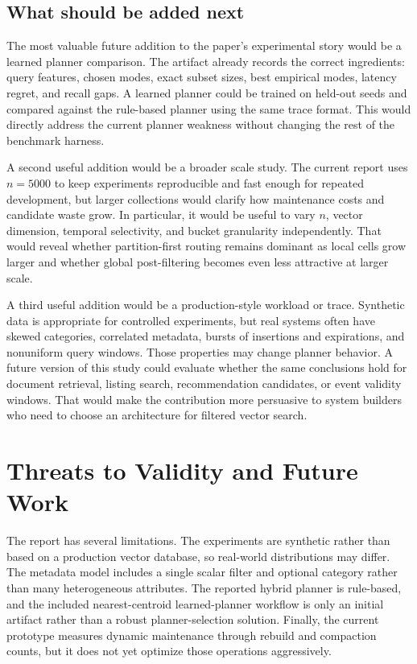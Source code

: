 \documentclass[sigconf,nonacm]{acmart}
\begin{document}
\subsection{What should be added next}

The most valuable future addition to the paper's experimental story would be a learned planner comparison. The artifact already records the correct ingredients: query features, chosen modes, exact subset sizes, best empirical modes, latency regret, and recall gaps. A learned planner could be trained on held-out seeds and compared against the rule-based planner using the same trace format. This would directly address the current planner weakness without changing the rest of the benchmark harness.

A second useful addition would be a broader scale study. The current report uses $n=5000$ to keep experiments reproducible and fast enough for repeated development, but larger collections would clarify how maintenance costs and candidate waste grow. In particular, it would be useful to vary $n$, vector dimension, temporal selectivity, and bucket granularity independently. That would reveal whether partition-first routing remains dominant as local cells grow larger and whether global post-filtering becomes even less attractive at larger scale.

A third useful addition would be a production-style workload or trace. Synthetic data is appropriate for controlled experiments, but real systems often have skewed categories, correlated metadata, bursts of insertions and expirations, and nonuniform query windows. Those properties may change planner behavior. A future version of this study could evaluate whether the same conclusions hold for document retrieval, listing search, recommendation candidates, or event validity windows. That would make the contribution more persuasive to system builders who need to choose an architecture for filtered vector search.

\section{Threats to Validity and Future Work}

The report has several limitations. The experiments are synthetic rather than based on a production vector database, so real-world distributions may differ. The metadata model includes a single scalar filter and optional category rather than many heterogeneous attributes. The reported hybrid planner is rule-based, and the included nearest-centroid learned-planner workflow is only an initial artifact rather than a robust planner-selection solution. Finally, the current prototype measures dynamic maintenance through rebuild and compaction counts, but it does not yet optimize those operations aggressively.
\end{document}
